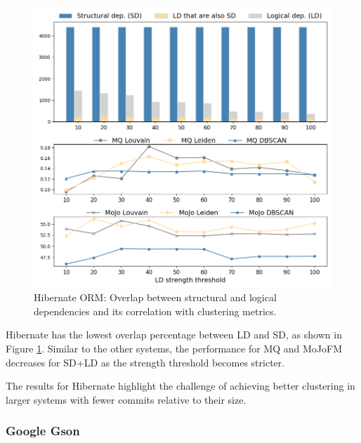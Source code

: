 \documentclass[12pt, a4paper, twoside]{report}
\begin{document}
\begin{figure}[t!]
  \centering
  \includegraphics[width=\columnwidth]{hibernate_correlation.png}
  \caption{Hibernate ORM: Overlap between structural and logical dependencies and its correlation with clustering metrics.}
  \label{fig:hibernate_correlation}
\end{figure}

Hibernate has the lowest overlap percentage between LD and SD, as shown in Figure \ref{fig:hibernate_correlation}. Similar to the other systems, the performance for MQ and MoJoFM decreases for SD+LD as the strength threshold becomes stricter.

The results for Hibernate highlight the challenge of achieving better clustering in larger systems with fewer commits relative to their size.


\subsubsection{Google Gson}
\end{document}
